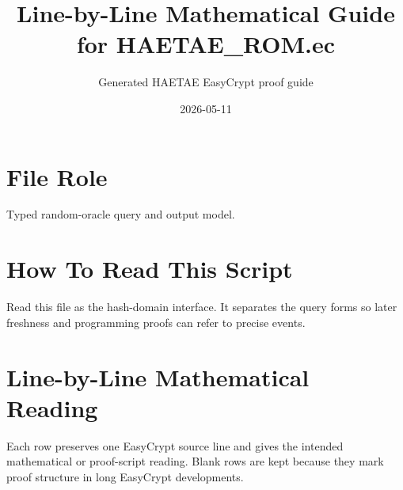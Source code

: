 \documentclass[10pt]{article}
\title{Line-by-Line Mathematical Guide for HAETAE\_ROM.ec}
\author{Generated HAETAE EasyCrypt proof guide}
\date{2026-05-11}
\begin{document}
\maketitle

\section*{File Role}
Typed random-oracle query and output model.

\section*{How To Read This Script}
Read this file as the hash-domain interface.  It separates the query forms so later freshness and programming proofs can refer to precise events.

\section*{Line-by-Line Mathematical Reading}
Each row preserves one EasyCrypt source line and gives the intended mathematical
or proof-script reading.  Blank rows are kept because they mark proof structure
in long EasyCrypt developments.
\end{document}
